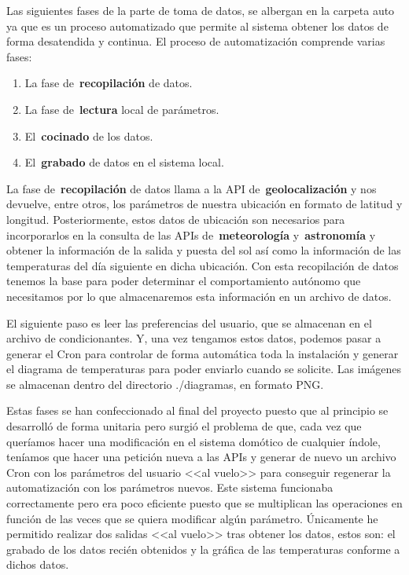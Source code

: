 Las siguientes fases de la parte de toma de datos, se albergan en la carpeta auto ya que es un proceso automatizado que permite al sistema obtener los datos de forma desatendida y continua.
El proceso de automatización comprende varias fases:
\begin{enumerate}
    \item La fase de~\textbf{recopilación} de datos.
    \item La fase de~\textbf{lectura} local de parámetros.
    \item El~\textbf{cocinado} de los datos.
    \item El~\textbf{grabado} de datos en el sistema local.
\end{enumerate}
La fase de~\textbf{recopilación} de datos llama a la API de~\textbf{geolocalización} y nos devuelve, entre otros, los parámetros de nuestra ubicación en formato de latitud y longitud. Posteriormente, estos datos de ubicación son necesarios para incorporarlos en la consulta de las APIs de~\textbf{meteorología} y~\textbf{astronomía} y obtener la información de la salida y puesta del sol así como la información de las temperaturas del día siguiente en dicha ubicación. Con esta recopilación de datos tenemos la base para poder determinar el comportamiento autónomo que necesitamos por lo que almacenaremos esta información en un archivo de datos.

El siguiente paso es leer las preferencias del usuario, que se almacenan en el archivo de condicionantes. Y, una vez tengamos estos datos, podemos pasar a generar el Cron para controlar de forma automática toda la instalación y generar el diagrama de temperaturas para poder enviarlo cuando se solicite. Las imágenes se almacenan dentro del directorio ./diagramas, en formato PNG.

Estas fases se han confeccionado al final del proyecto puesto que al principio se desarrolló de forma unitaria pero surgió el problema de que, cada vez que queríamos hacer una modificación en el sistema domótico de cualquier índole, teníamos que hacer una petición nueva a las APIs y generar de nuevo un archivo Cron con los parámetros del usuario <<al vuelo>> para conseguir regenerar la automatización con los parámetros nuevos. Este sistema funcionaba correctamente pero era poco eficiente puesto que se multiplican las operaciones en función de las veces que se quiera modificar algún parámetro.
Únicamente he permitido realizar dos salidas <<al vuelo>> tras obtener los datos, estos son: el grabado de los datos recién obtenidos y la gráfica de las temperaturas conforme a dichos datos.

